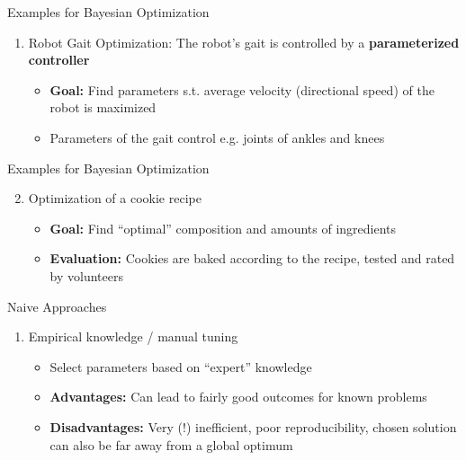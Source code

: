 \documentclass[11pt,compress,t,notes=noshow, xcolor=table]{beamer}
\begin{document}
\begin{framev}{Examples for Bayesian Optimization}
\begin{enumerate}
\item Robot Gait Optimization: The robot's gait is controlled by a \textbf{parameterized controller} 
\spacer
{}
\begin{itemize}\footnotesize
\item \textbf{Goal: } Find parameters s.t. average velocity (directional speed) of the robot is maximized
\item Parameters of the gait control e.g. joints of ankles and knees
\end{itemize}
\end{enumerate}
\end{framev}


\begin{framev}{Examples for Bayesian Optimization}
\begin{enumerate}
\setcounter{enumi}{1}
\item Optimization of a cookie recipe 
\spacer
{}
\spacer
\begin{itemize}
\item \textbf{Goal: } Find \enquote{optimal} composition and amounts of ingredients
\item \textbf{Evaluation: } Cookies are baked according to the recipe, tested and rated by volunteers
\end{itemize}
\end{enumerate}
\end{framev}


\begin{framev}{Naive Approaches}
\begin{enumerate}
\item Empirical knowledge / manual tuning
\begin{itemize}
\item Select parameters based on \enquote{expert} knowledge
\item \textbf{Advantages:} Can lead to fairly good outcomes for known problems
\item \textbf{Disadvantages:} Very (!) inefficient, poor reproducibility, chosen solution can also be far away from a global optimum
\end{itemize}
\end{enumerate}
\end{framev}
\end{document}

